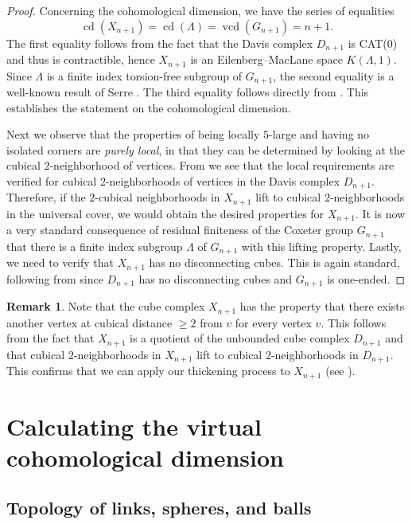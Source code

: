 \documentclass[12pt, letterpaper]{article}
\newcommand{\cd}{\operatorname{cd}}
\newcommand{\vcd}{\operatorname{vcd}}
\theoremstyle{plain}
\theoremstyle{definition}
\newtheorem{rmk}[thm]{Remark}
\begin{document}
\begin{proof}
Concerning the cohomological dimension, we have the series of equalities
    \[ \cd(X_{n+1})= \cd(\Lambda)=\vcd(G_{n+1})= n+1. \]
The first equality follows from the fact that the Davis complex $D_{n+1}$ is CAT($0$) and thus is contractible, hence $X_{n+1}$ is an Eilenberg--MacLane space $K(\Lambda,1)$. Since $\Lambda$ is a finite index torsion-free subgroup of $G_{n+1}$, the second equality is a well-known result of Serre \cite[Thm.\ F.3.4]{Davis}. The third equality follows directly from . This establishes the statement on the cohomological dimension.
    
Next we observe that the properties of being locally $5$-large and having no isolated corners are \emph{purely local}, in that they can be determined by looking at the cubical $2$-neighborhood of vertices. From  we see that the local requirements are verified for cubical $2$-neighborhoods of vertices in the Davis complex $D_{n+1}$. Therefore, if the $2$-cubical neighborhoods in $X_{n+1}$ lift to cubical $2$-neighborhoods in the universal cover, we would obtain the desired properties for $X_{n+1}$. It is now a very standard consequence of residual finiteness of the Coxeter group $G_{n+1}$ that there is a finite index subgroup $\Lambda$ of $G_{n+1}$ with this lifting property. Lastly, we need to verify that $X_{n+1}$ has no disconnecting cubes. This is again standard, following from  since $D_{n+1}$ has no disconnecting cubes and $G_{n+1}$ is one-ended.
\end{proof}

\begin{rmk}
    Note that the cube complex $X_{n+1}$ has the property that there exists another vertex at cubical distance $\geq 2$ from $v$ for every vertex $v$. This follows from the fact that $X_{n+1}$ is a quotient of the unbounded cube complex $D_{n+1}$ and that cubical $2$-neighborhoods in $X_{n+1}$ lift to cubical $2$-neighborhoods in $D_{n+1}$. This confirms that we can apply our thickening process to $X_{n+1}$ (see ).
\end{rmk}

\section{Calculating the virtual cohomological dimension}

\subsection{Topology of links, spheres, and balls}\label{subsec:generalities}
\end{document}
